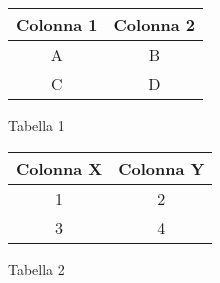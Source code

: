 \documentclass{article}
\begin{document}
\lipsum[1] %

\begin{figure}[ht]
\begin{minipage}[b]{0.4\linewidth}
  \centering
  \begin{tabular}{|c|c|}
    \hline
    Colonna 1 & Colonna 2 \\
    \hline
    A & B \\
    C & D \\
    \hline
  \end{tabular}
  \caption{Tabella 1}
  \label{tab:tabella1}
\end{minipage}
\hfill
\begin{minipage}[b]{0.4\linewidth}
  \centering
  \begin{tabular}{|c|c|}
    \hline
    Colonna X & Colonna Y \\
    \hline
    1 & 2 \\
    3 & 4 \\
    \hline
  \end{tabular}
  \caption{Tabella 2}
  \label{tab:tabella2}
\end{minipage}
\end{figure}

\lipsum[2] %
\end{document}
